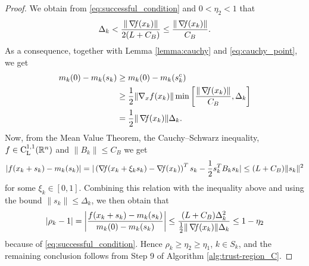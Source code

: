 \documentclass[10pt,a4paper]{article}
\begin{document}
\begin{proof}
	We obtain from \eqref{eq:successful_condition} and $0 < \eta_2 < 1$ that
	\begin{equation*}
		\Delta_k < \frac{\|\operatorname*{\mathit{\nabla \!f}}(x_k)\|}{2(L + C_B)} \leq \frac{\|\operatorname*{\mathit{\nabla \!f}}(x_k)\|}{C_B}.
	\end{equation*}
	As a consequence, together with Lemma \ref{lemma:cauchy} and \eqref{eq:cauchy_point}, we get
	\begin{align*}
		m_k(0) - m_k(s_k) &\geq m_k(0) - m_k(s_k^c) \\
		&\geq \frac{1}{2} \|\nabla_x f(x_k)\| \min \left[ \frac{\|\operatorname*{\mathit{\nabla \!f}}(x_k)\|}{C_B}, \Delta_k \right] \\
		&= \frac{1}{2} \|\operatorname*{\mathit{\nabla \!f}}(x_k)\| \Delta_k.
	\end{align*}
	Now, from the Mean Value Theorem, the Cauchy--Schwarz inequality, $f\in \mathord{\mathrm{C^{1,1}_{L}}}(\mathbb{R}^n)$ and $\|B_k\| \leq C_B$ we get
	\begin{equation*}
		|f(x_k + s_k) - m_k(s_k)| = |\left(\operatorname*{\mathit{\nabla \!f}}(x_k+\xi_k s_k) - \operatorname*{\mathit{\nabla \!f}}(x_k) \right)^Ts_k  - \frac{1}{2}  s_k^TB_k s_k | \leq (L + C_B) \|s_k\|^2
	\end{equation*}
	for some $\xi_k \in [0, 1]$. Combining this relation with the inequality above and using the bound $\|s_k\| \leq \Delta_k$, we then obtain that
	\begin{equation*}
		|\rho_k - 1| = \left| \frac{f(x_k + s_k) - m_k(s_k)}{m_k(0) - m_k(s_k)} \right| \leq \frac{(L + C_B) \Delta_k^2}{\frac{1}{2} \|\operatorname*{\mathit{\nabla \!f}}(x_k)\| \Delta_k} \leq 1 - \eta_2
	\end{equation*}
	because of \eqref{eq:successful_condition}. Hence $\rho_k \geq \eta_2 \geq \eta_1$, $k \in S_k$, and the remaining conclusion follows from Step 9 of Algorithm \ref{alg:trust-region_C}. 
\end{proof} 
\end{document}
